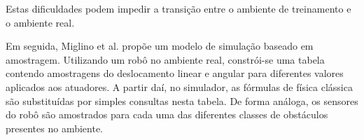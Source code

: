 Estas dificuldades podem impedir a transição entre o ambiente de treinamento e o ambiente real.

Em seguida, Miglino et al. \cite{miglino1996evolving} propõe um modelo de simulação baseado em amostragem. Utilizando um robô no ambiente real, constrói-se uma tabela contendo amostragens do deslocamento linear e angular para diferentes valores aplicados aos atuadores. A partir daí, no simulador, as fórmulas de física clássica são substituídas por simples consultas nesta tabela. De forma análoga, os sensores do robô são amostrados para cada uma das diferentes classes de obstáculos presentes no ambiente.